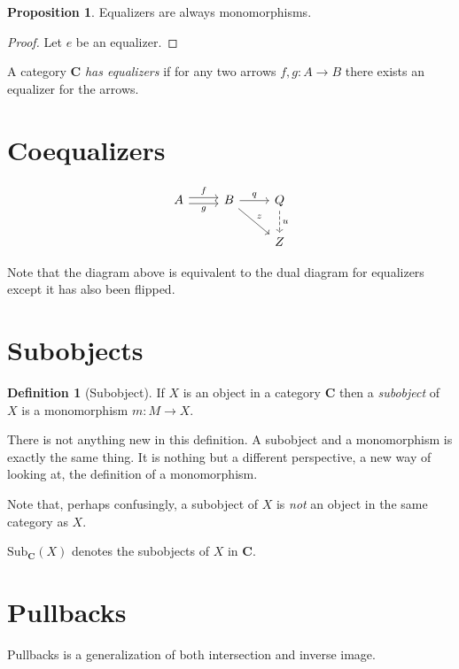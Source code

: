 \documentclass{book}
\theoremstyle{definition}
\newtheorem{definition}{Definition}[section]
\newtheorem{proposition}{Proposition}
\begin{document}
\begin{proposition}
  Equalizers are always monomorphisms.
\end{proposition}
\begin{proof}
  Let $e$ be an equalizer. %
\end{proof}

\begin{remark}
  A category \textbf{C} \emph{has equalizers} if for any two arrows
  $f, g : A \to B$ there exists an equalizer for the arrows.
\end{remark}

\section{Coequalizers}

\[
  \begin{tikzcd}
    A \ar[r, shift left, "f"] \ar[r, shift right, "g"'] & B \ar[r, "q"] \ar[rd, "z"] & Q \ar[d, dashrightarrow, "u"] \\
    & & Z
  \end{tikzcd}
\]

Note that the diagram above is equivalent to the dual diagram for equalizers
except it has also been flipped.

\section{Subobjects}

\begin{definition}[Subobject]
  If $X$ is an object in a category \textbf{C} then a \emph{subobject} of $X$ is
  a monomorphism $m : M \to X$.
\end{definition}

There is not anything new in this definition. A subobject and a monomorphism is
exactly the same thing. It is nothing but a different perspective, a new way of
looking at, the definition of a monomorphism.

Note that, perhaps confusingly, a subobject of $X$ is \emph{not} an object in
the same category as $X$.

$\text{Sub}_{\mathbf{C}}(X)$ denotes the subobjects of $X$ in \textbf{C}.

\section{Pullbacks}

Pullbacks is a generalization of both intersection and inverse
image. %
\end{document}

